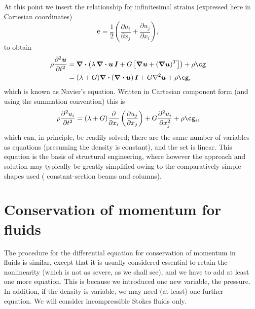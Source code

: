 \documentclass[twoside,11pt]		{report}
\begin{document}
At this point we insert the relationship for infinitesimal strains
(expressed here in Cartesian coordinates)
\[
\bm{e}=\frac{1}{2}\left(\frac{\partial u_i}{\partial x_j} + 
                        \frac{\partial u_j}{\partial x_i}\right),
\]
to obtain 
\begin{align}
\rho\frac{\partial^2 \bm{u}}{\partial t^2}
&=
\bm{\nabla\cdot}\left(\lambda\,\bm{\nabla\cdot u\,I} +
G\left[\bm{\nabla u} + (\bm{\nabla u})^T\right]\right) +
\rho\bm{\cg}\\
&=
(\lambda + G) \bm{\nabla\cdot}\left(\bm{\nabla\cdot u}\right)\bm{I} +
G\nabla^2\bm{u} +
\rho\bm{\cg},
\end{align}
which is known as Navier's equation.  Written in Cartesian component
form (and using the summation convention) this is
\begin{equation}
\rho\frac{\partial^2 u_i}{\partial t^2}
=
(\lambda + G) \frac{\partial}{\partial x_i}\left(
\frac{\partial u_j}{\partial x_j}\right) +
G\frac{\partial^2 u_i}{\partial x_j^2} +
\rho\cg_i,
\end{equation}
which can, in principle, be readily solved; there are the same number
of variables as equations (presuming the density is constant), and the
set is linear. This equation is the basis of structural engineering,
where however the approach and solution may typically be greatly
simplified owing to the comparatively simple shapes used (\eg
constant-section beams and columns).


\section{Conservation of momentum for fluids}

The procedure for the differential equation for conservation of
momentum in fluids is similar, except that it is usually considered
essential to retain the nonlinearity (which is not as severe, as we
shall see), and we have to add at least one more equation. This is
because we introduced one new variable, the pressure. In addition, if
the density is variable, we may need (at least) one further equation.
We will consider incompressible Stokes fluids only.
\end{document}
